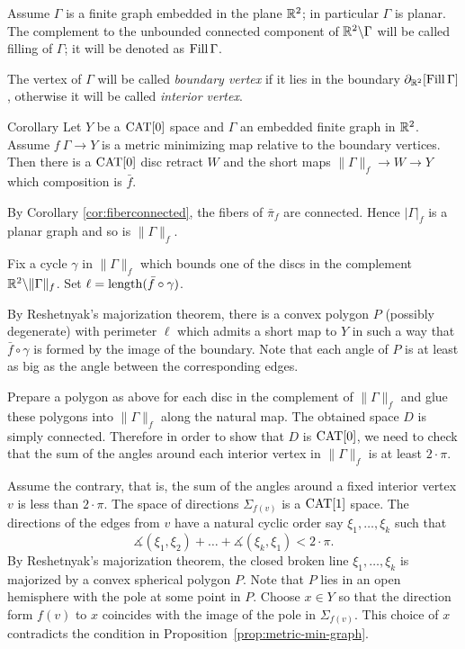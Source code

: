 \documentclass{article}
\begin{document}
Assume $\Gamma$ is a finite graph embedded in the plane $\mathbb{R}^2$;
in particular $\Gamma$ is planar.
The complement to the unbounded connected component of $\mathbb{R}^2\backslash\Gamma$ will be called filling of $\Gamma$;
it will be denoted as $\mathop{\rm Fill}\Gamma$.

The vertex of $\Gamma$ will be called \emph{boundary vertex}
if it lies in the boundary $\partial_{\mathbb{R}^2}[\mathop{\rm Fill}\Gamma]$,
otherwise it will be called \emph{interior vertex}.

\begin{thm}{Corollary}\label{cor:planar-minimizing-graph}
Let $Y$ be a $\mathop{\rm CAT}\nolimits[0]$ space and
$\Gamma$ an embedded finite graph in $\mathbb{R}^2$.
Assume $f\:\Gamma\to Y$ is a metric minimizing map relative to the boundary vertices. 
Then there is a $\mathop{\rm CAT}\nolimits[0]$ disc retract $W$
and the short maps $\|\Gamma\|_f\to W\to Y$ which composition is 
 $\bar f$.
\end{thm}


By Corollary \ref{cor:fiberconnected}, the fibers of $\bar\pi_f$ are connected.
Hence $|\Gamma|_f$ is 
a planar graph and so is $\|\Gamma\|_f$.


Fix a cycle $\gamma$ in $\|\Gamma\|_f$ which bounds one of the discs in the complement $\mathbb{R}^2\backslash \|\Gamma\|_f$.
Set $\ell=\mathop{\rm length}\nolimits (\bar f\circ\gamma)$.

By Reshetnyak's majorization theorem, there is a convex polygon $P$ (possibly degenerate) with perimeter $\ell$ which admits 
a short map to $Y$ in such a way that $\bar f\circ\gamma$ is formed by the image of the boundary.
Note that each angle of $P$ is at least as big as 
the angle between the corresponding edges.

Prepare a polygon as above for each disc in the complement of $\|\Gamma\|_f$
and glue these polygons into $\|\Gamma\|_f$ along the natural map.
The obtained space $D$ is simply connected.
Therefore in order to show that $D$ is $\mathop{\rm CAT}\nolimits[0]$,
we need to check that the sum of the angles around each interior vertex in $\|\Gamma\|_f$ is at least $2\cdot\pi$.


Assume the contrary, that is, 
the sum of the angles around a fixed interior vertex $v$ is less than $2\cdot\pi$.
The space of directions $\Sigma_{f(v)}$ is a $\mathop{\rm CAT}\nolimits[1]$ space.
The directions of the edges from $v$ have a natural
cyclic order say $\xi_1,\dots,\xi_k$
such that
\[\measuredangle(\xi_1,\xi_2)+\dots+\measuredangle(\xi_k,\xi_1)<2\cdot\pi.\]
By Reshetnyak's majorization theorem,
the closed broken line $\xi_1,\dots,\xi_k$ is majorized by a convex spherical polygon $P$.
Note that $P$ lies in an open hemisphere with the pole  at some point in $P$.
Choose $x\in Y$ so that the direction form $f(v)$ to $x$ coincides with the image of the pole in $\Sigma_{f(v)}$.
This choice of $x$ contradicts the condition in Proposition~\ref{prop:metric-min-graph}.
\end{document}
